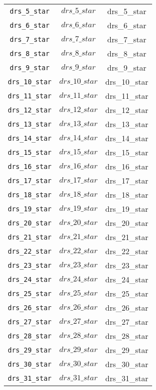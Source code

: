 \begin{center}
\begin{longtable}{ccc}
\texttt{drs\_5\_star} & $drs\_5\_star$ & drs\_5\_star\\
\texttt{drs\_6\_star} & $drs\_6\_star$ & drs\_6\_star\\
\texttt{drs\_7\_star} & $drs\_7\_star$ & drs\_7\_star\\
\texttt{drs\_8\_star} & $drs\_8\_star$ & drs\_8\_star\\
\texttt{drs\_9\_star} & $drs\_9\_star$ & drs\_9\_star\\
\texttt{drs\_10\_star} & $drs\_10\_star$ & drs\_10\_star\\
\texttt{drs\_11\_star} & $drs\_11\_star$ & drs\_11\_star\\
\texttt{drs\_12\_star} & $drs\_12\_star$ & drs\_12\_star\\
\texttt{drs\_13\_star} & $drs\_13\_star$ & drs\_13\_star\\
\texttt{drs\_14\_star} & $drs\_14\_star$ & drs\_14\_star\\
\texttt{drs\_15\_star} & $drs\_15\_star$ & drs\_15\_star\\
\texttt{drs\_16\_star} & $drs\_16\_star$ & drs\_16\_star\\
\texttt{drs\_17\_star} & $drs\_17\_star$ & drs\_17\_star\\
\texttt{drs\_18\_star} & $drs\_18\_star$ & drs\_18\_star\\
\texttt{drs\_19\_star} & $drs\_19\_star$ & drs\_19\_star\\
\texttt{drs\_20\_star} & $drs\_20\_star$ & drs\_20\_star\\
\texttt{drs\_21\_star} & $drs\_21\_star$ & drs\_21\_star\\
\texttt{drs\_22\_star} & $drs\_22\_star$ & drs\_22\_star\\
\texttt{drs\_23\_star} & $drs\_23\_star$ & drs\_23\_star\\
\texttt{drs\_24\_star} & $drs\_24\_star$ & drs\_24\_star\\
\texttt{drs\_25\_star} & $drs\_25\_star$ & drs\_25\_star\\
\texttt{drs\_26\_star} & $drs\_26\_star$ & drs\_26\_star\\
\texttt{drs\_27\_star} & $drs\_27\_star$ & drs\_27\_star\\
\texttt{drs\_28\_star} & $drs\_28\_star$ & drs\_28\_star\\
\texttt{drs\_29\_star} & $drs\_29\_star$ & drs\_29\_star\\
\texttt{drs\_30\_star} & $drs\_30\_star$ & drs\_30\_star\\
\texttt{drs\_31\_star} & $drs\_31\_star$ & drs\_31\_star\\

\end{longtable}
\end{center}

